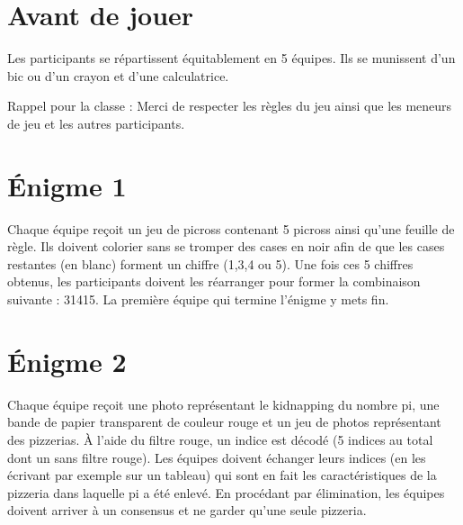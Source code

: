 \documentclass[12pt, parskip=half-]{scrartcl}
\begin{document}

\section*{Avant de jouer}
Les participants se répartissent équitablement en 5 équipes. Ils se munissent d'un bic ou d'un crayon et d'une calculatrice.

Rappel pour la classe : 
\og
Merci de respecter les règles du jeu ainsi que les meneurs de jeu et les autres participants.
\fg

\section*{Énigme 1}
Chaque équipe reçoit un jeu de picross contenant 5 picross ainsi qu'une feuille de règle. Ils doivent colorier sans se tromper des cases en noir afin de que les cases restantes (en blanc) forment un chiffre (1,3,4 ou 5). Une fois ces 5 chiffres obtenus, les participants doivent les réarranger pour former la combinaison suivante : 31415. La première équipe qui termine l'énigme y mets fin.

\section*{Énigme 2}
Chaque équipe reçoit une photo représentant le kidnapping du nombre pi, une bande de papier transparent de couleur rouge et un jeu de photos représentant des pizzerias.
À l'aide du filtre rouge, un indice est décodé (5 indices au total dont un sans filtre rouge). Les équipes doivent échanger leurs indices (en les écrivant par exemple sur un tableau) qui sont en fait les caractéristiques de la pizzeria dans laquelle pi a été enlevé. En procédant par élimination, les équipes doivent arriver à un consensus et ne garder qu'une seule pizzeria.
\end{document}
